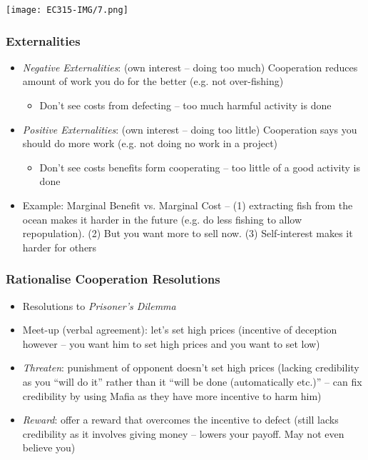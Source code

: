 \documentclass[11pt, english]{article}
\begin{document}
	\begin{center}
		\texttt{[image: EC315-IMG/7.png]}
	\end{center}

		\subsubsection{Externalities}

	\begin{itemize}
        \setlength\itemsep{0cm}
		\item \textit{Negative Externalities}: (own interest – doing too much) Cooperation reduces amount of work you do for the better (e.g. not over-fishing)
		\begin{itemize}
			\item Don't see costs from defecting – too much harmful activity is done
		\end{itemize}
		\item \textit{Positive Externalities}: (own interest – doing too little) Cooperation says you should do more work (e.g. not doing no work in a project)
		\begin{itemize}
                        \item Don't see costs benefits form cooperating – too little of a good activity is done
                \end{itemize}
		\item Example: Marginal Benefit vs. Marginal Cost – (1) extracting fish from the ocean makes it harder in the future (e.g. do less fishing to allow repopulation). (2) But you want more to sell now. (3) Self-interest makes it harder for others
	\end{itemize}

		\subsubsection{Rationalise Cooperation Resolutions}

	\begin{itemize}
        \setlength\itemsep{0cm}
		\item Resolutions to \textit{Prisoner's Dilemma}
		\item Meet-up (verbal agreement): let's set high prices (incentive of deception however – you want him to set high prices and you want to set low)
		\item \textit{Threaten}: punishment of opponent doesn't set high prices (lacking credibility as you ``will do it'' rather than it ``will be done (automatically etc.)'' – can fix credibility by using Mafia as they have more incentive to harm him)
		\item \textit{Reward}: offer a reward that overcomes the incentive to defect (still lacks credibility as it involves giving money – lowers your payoff. May not even believe you)
	\end{itemize}
\end{document}
